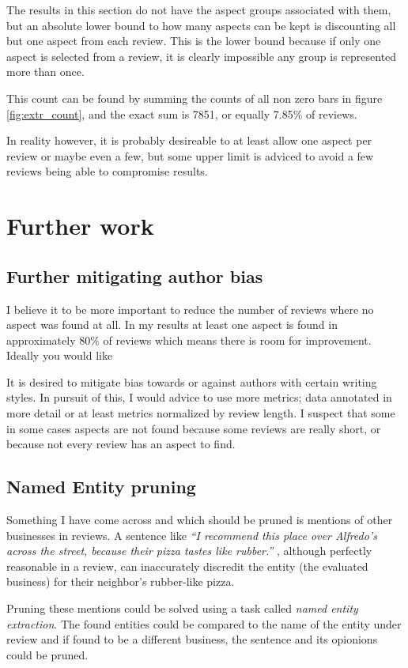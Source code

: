 \documentclass[a4paper,11pt]{kth-mag}
\begin{document}
The results in this section do not have the aspect groups associated with them,
but an absolute lower bound to how many aspects can be kept
is discounting all but one aspect from each review.
This is the lower bound because if only one aspect is selected from a review, it is clearly impossible any
group is represented more than once.

This count can be found by summing the counts of all non zero bars in figure \ref{fig:extr_count}, and the
exact sum is 7851, or equally 7.85\% of reviews.

In reality however, it is probably desireable to at least allow one aspect per review or maybe even a few,
but some upper limit is adviced to avoid a few reviews being able to compromise results.


\section{Further work}
\subsection{Further mitigating author bias}
I believe it to be more important to reduce the number of reviews where no aspect was
found at all. In my results at least one aspect is found in approximately
80\% of reviews which means there is room for improvement. Ideally you would like 

It is desired to mitigate bias towards or against authors with certain writing styles.
In pursuit of this, I would advice to use more metrics; data annotated in more detail
or at least metrics normalized by review length. I suspect that some in some cases
aspects are not found because some reviews are really short, or because not every review
has an aspect to find.


\subsection{Named Entity pruning}

Something I have come across and which should be pruned is mentions of other businesses
in reviews. A sentence like
\emph{``I recommend this place over Alfredo's across the street, because their pizza tastes like rubber.''}
, although perfectly reasonable in a review, can inaccurately discredit
the entity (the evaluated business) for their neighbor's rubber-like pizza.

Pruning these mentions could be solved using a task called \emph{named entity extraction}.
The found entities could be compared to the name of the entity under review and if found to be a different business,
the sentence and its opionions could be pruned.
\end{document}
